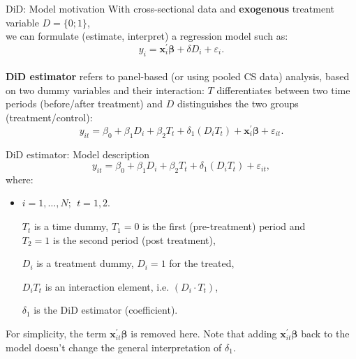 \documentclass{beamer}
\begin{document}
\begin{frame}{DiD: Model motivation}
\small
With cross-sectional data and \textbf{exogenous}  treatment variable $D = \{0;1\}$, \\we can formulate (estimate, interpret) a regression model such as:
$$
y_i = \bm{x}_i^{\prime}\bm{\beta} + \delta D_i + \varepsilon_i.
$$\\
\medskip
\textbf{DiD estimator} refers to panel-based (or using pooled CS data) analysis, based on two dummy variables and their interaction: $T$ differentiates between two time periods (before/after treatment) and $D$ distinguishes the two groups (treatment/control):
$$y_{it}=\beta_0 + \beta_1 D_i + \beta_2 T_t + \delta_1 (D_i T_t) + \bm{x}_i^{\prime}\bm{\beta} + \varepsilon_{it}.$$

\end{frame}
\begin{frame}{DiD estimator: Model description} 
\medskip 
$$y_{it}=\beta_0 + \beta_1 D_i + \beta_2 T_t + \delta_1 (D_i T_t) + \varepsilon_{it},$$
where:
\begin{itemize}
\item $i=1, \dots, N;~~t=1,2$. \\
\item[$T_t$] is a time dummy, $T_1=0$ is the first (pre-treatment) period and \\$T_2 = 1$ is the second period (post treatment),
\item[$D_i$] is a treatment dummy, $D_i=1$ for the treated,
\item[$D_i T_t$] is an interaction element, i.e. $(D_i\! \cdot \! T_t)$,
\item[$\delta_1$] is the DiD estimator (coefficient). 
\end{itemize}
\bigskip
For simplicity, the term $\bm{x}_{it}^{\prime}\bm{\beta}$ is removed here. Note that adding $\bm{x}_{it}^{\prime}\bm{\beta}$ back to the model doesn't change the general interpretation of $\delta_1$.
\end{frame}
\end{document}

